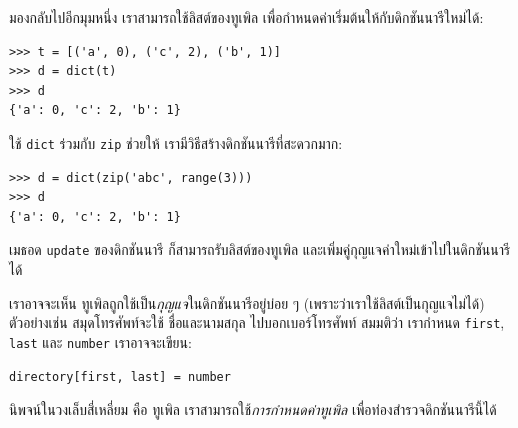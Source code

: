 %
มองกลับไปอีกมุมหนึ่ง
เราสามารถใช้ลิสต์ของทูเพิล
เพื่อกำหนดค่าเริ่มต้นให้กับดิกชันนารีใหม่ได้:

\begin{verbatim}
>>> t = [('a', 0), ('c', 2), ('b', 1)]
>>> d = dict(t)
>>> d
{'a': 0, 'c': 2, 'b': 1}
\end{verbatim}

%
ใช้ \texttt{dict} ร่วมกับ \texttt{zip} ช่วยให้ เรามีวิธีสร้างดิกชันนารีที่สะดวกมาก:

\begin{verbatim}
>>> d = dict(zip('abc', range(3)))
>>> d
{'a': 0, 'c': 2, 'b': 1}
\end{verbatim}
%
%
เมธอด \texttt{update} ของดิกชันนารี
ก็สามารถรับลิสต์ของทูเพิล
และเพิ่มคู่กุญแจค่าใหม่เข้าไปในดิกชันนารีได้
%

%
เราอาจจะเห็น ทูเพิลถูกใช้เป็น\textit{กุญแจ}ในดิกชันนารีอยู่บ่อย ๆ (เพราะว่าเราใช้ลิสต์เป็นกุญแจไม่ได้)
ตัวอย่างเช่น สมุดโทรศัพท์จะใช้ ชื่อและนามสกุล ไปบอกเบอร์โทรศัพท์
สมมติว่า เรากำหนด \texttt{first}, \texttt{last} และ \texttt{number} เราอาจจะเขียน:
%

%
%
%
\begin{verbatim}
directory[first, last] = number
\end{verbatim}
%
นิพจน์ในวงเล็บสี่เหลี่ยม คือ ทูเพิล
เราสามารถใช้\textit{การกำหนดค่าทูเพิล} เพื่อท่องสำรวจดิกชันนารีนี้ได้

